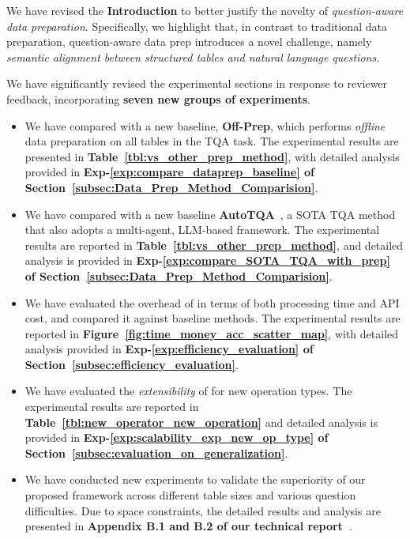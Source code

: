 We have revised the \textbf{Introduction} to better justify the novelty of \emph{question-aware data preparation}. Specifically, we highlight that, in contrast to traditional data preparation, question-aware data prep introduces a novel challenge, namely \emph{semantic alignment between structured tables and natural language questions}.


We have significantly revised the experimental sections in response to reviewer feedback, incorporating \textbf{seven new groups of experiments}.
\begin{itemize}[leftmargin=15pt]
	\item[(1)] We have compared \sys with a new baseline, \textbf{Off-Prep}, which performs \emph{offline} data preparation on all tables in the TQA task. The experimental results are presented in \textbf{Table~\ref{tbl:vs_other_prep_method}}, with detailed analysis provided in \textbf{Exp-\ref{exp:compare_dataprep_baseline} of Section~\ref{subsec:Data_Prep_Method_Comparision}}.
	\item[(2)] We have compared \sys with a new baseline \textbf{AutoTQA}~\cite{DBLP:journals/pvldb/ZhuCXLSZSTL24}, a SOTA TQA method that also adopts a multi-agent, LLM-based framework.
	The experimental results are reported in \textbf{Table~\ref{tbl:vs_other_prep_method}}, and detailed analysis is provided in \textbf{Exp-\ref{exp:compare_SOTA_TQA_with_prep} of Section~\ref{subsec:Data_Prep_Method_Comparision}}.
	\item[(3)] We have evaluated the overhead of \sys in terms of both processing time and API cost, and compared it against baseline methods.
    The experimental results are reported in \textbf{Figure~\ref{fig:time_money_acc_scatter_map}}, with detailed analysis provided in \textbf{Exp-\ref{exp:efficiency_evaluation} of Section~\ref{subsec:efficiency_evaluation}}.
	\item[(4)] We have evaluated the \emph{extensibility} of \sys for new operation types. The experimental results are reported in 
	\textbf{Table~\ref{tbl:new_operator_new_operation}} and detailed analysis is provided in \textbf{Exp-\ref{exp:scalability_exp_new_op_type} of Section~\ref{subsec:evaluation_on_generalization}}.	
	\item[(5)] We have conducted new experiments to validate the superiority of our proposed framework \sys across different table sizes and various question difficulties. Due to space constraints, the detailed results and analysis are presented in \textbf{Appendix B.1 and B.2 of our technical report~\cite{technical_report}}.

\end{itemize}
